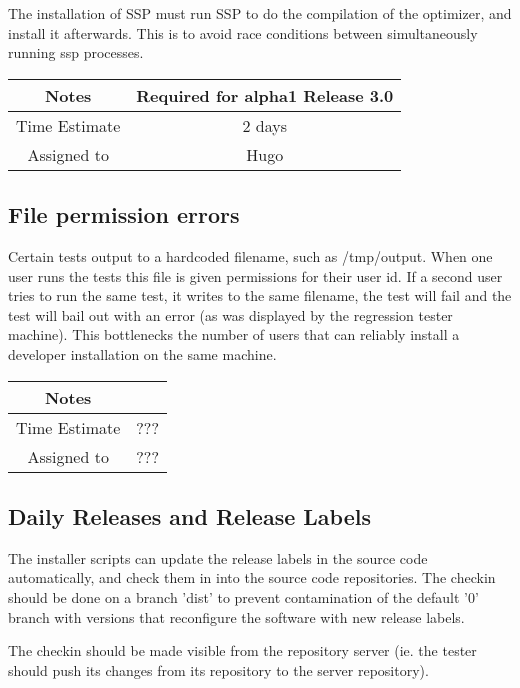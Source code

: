 \documentclass[12pt]{article}
\begin{document}
The installation of SSP must run SSP to do the compilation of the
optimizer, and install it afterwards.  This is to avoid race
conditions between simultaneously running ssp processes.

{
  \vspace{5mm}
  \centering
  \begin{tabular}{|c|c|}
    \hline
    Notes
    & Required for alpha1 Release 3.0 \\
    \hline
    Time Estimate
    & 2 days \\
    \hline
    Assigned to
    & Hugo \\
    \hline
  \end{tabular}
}


\subsection{File permission errors}

Certain tests output to a hardcoded filename, such as /tmp/output.
When one user runs the tests this file is given permissions for their
user id. If a second user tries to run the same test, it writes to the
same filename, the test will fail and the test will bail out with an
error (as was displayed by the regression tester machine).  This
bottlenecks the number of users that can reliably install a developer
installation on the same machine.


{
  \vspace{5mm}
  \centering
  \begin{tabular}{|c|c|}
    \hline
    Notes
    &  \\
    \hline
    Time Estimate
    & ??? \\
    \hline
    Assigned to
    & ??? \\
    \hline
  \end{tabular}
}


\subsection{Daily Releases and Release Labels}

The installer scripts can update the release labels in the source code
automatically, and check them in into the source code repositories.
The checkin should be done on a branch 'dist' to prevent contamination
of the default '0' branch with versions that reconfigure the software
with new release labels.

The checkin should be made visible from the repository server (ie. the
tester should push its changes from its repository to the server
repository).
\end{document}
